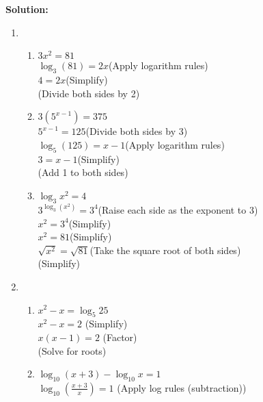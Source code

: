 \documentclass[9pt]{article}
\begin{document}
  \textbf{Solution:}   \\
\begin {enumerate}
	\item 
		\begin {enumerate}
			\item 
				$3x^2 = 81$\\
				$\log_3(81) = 2x $\hfill(Apply logarithm rules)\\
				$4 = 2x$\hfill(Simplify)\\
				\hfill(Divide both sides by 2)\\
			\item 
				$3(5^{x-1}) = 375 $\\
				$5^{x-1} = 125 $\hfill(Divide both sides by 3)\\
				$\log_5(125) = x-1 $\hfill(Apply logarithm rules)\\
				$3 = x-1 $\hfill(Simplify)\\
				\hfill(Add 1 to both sides)\\
			\item 
				$ \log_3 x^2  = 4 $ \\
				$3^{\log_3(x^2)} = 3^4 $\hfill(Raise each side as the exponent to 3)\\
				$x^2 = 3^4 $\hfill(Simplify)\\
				$x^2 = 81 $\hfill(Simplify)\\
				$\sqrt{x^2} = \sqrt{81} $\hfill(Take the square root of both sides)\\
				\hfill(Simplify)\\
		\end{enumerate}
	\item 
		\begin {enumerate}
			\item 
				$x^2 - x = \log_5 25 $\\
				$x^2 - x = 2 $ \hfill (Simplify)\\
				$x( x-1 ) = 2$ \hfill (Factor)\\
				 \hfill (Solve for roots)\\
			\item 
				$ \log_{10} (x+3) - \log_{10} x = 1 $ \\
				$ \log_{10} \left(\frac{x+3}{x}\right) = 1$ \hfill (Apply log rules (subtraction)) \\

\end{enumerate}
\end{enumerate}
\end{document}
